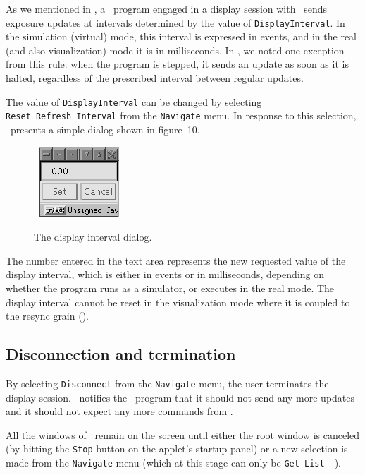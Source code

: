 As we mentioned in , a \smurph\ program engaged in a display
session with \dsd\ sends exposure updates at intervals determined by the
value of {\tt DisplayInterval}.
In the simulation (virtual) mode, this interval is expressed in events, and
in the real (and also visualization)
mode it is in milliseconds.
In , we noted one exception from this rule: when the program
is stepped, it sends an update as soon as it is halted, regardless of the
prescribed interval between regular updates.

The value of {\tt DisplayInterval} can be changed by selecting
{\tt Reset~Refresh~Interval} from the {\tt Navigate} menu.
In response to this selection, \dsd\ presents a simple dialog
shown in
figure~10.

\begin{figure}[htbp]%
\begin{center}
\ \includegraphics{FIGURES/dsddin.png}
\caption{The display interval dialog.}%
\end{center}
\end{figure}%

The number entered in the text area represents the new requested value of the
display interval, which is either in events or in milliseconds, depending
on whether the program runs as a simulator, or executes in the real mode.
The display interval cannot be reset
in the visualization mode where it is coupled
to the resync grain ().

\subsection{Disconnection and termination}

By selecting {\tt Disconnect} from the {\tt Navigate} menu, the user
terminates the display session.
\dsd\ notifies the \smurph\ program that it should not send any more
updates and it should not expect any more commands from \dsd.

All the windows of \dsd\ remain on the screen until either the root window
is canceled (by hitting the {\tt Stop} button on the applet's startup panel)
or a new selection is made from the {\tt Navigate} menu (which at this
stage can only be {\tt Get~List}---).

